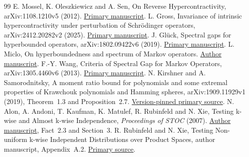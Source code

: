 \documentclass[11pt]{article}
\begin{document}
\begin{thebibliography}{99}
E. Mossel, K. Oleszkiewicz and A. Sen,
On Reverse Hypercontractivity, arXiv:1108.1210v5 (2012).
\href{https://arxiv.org/abs/1108.1210}{Primary manuscript}.
L. Gross, Invariance of intrinsic hypercontractivity under perturbation of
Schr\"odinger operators, arXiv:2412.20282v2 (2025).
\href{https://arxiv.org/abs/2412.20282}{Primary manuscript}.
J. Gl\"uck, Spectral gaps for hyperbounded operators,
arXiv:1802.09422v6 (2019).
\href{https://arxiv.org/abs/1802.09422}{Primary manuscript}.
L. Miclo, On hyperboundedness and spectrum of Markov operators.
\href{https://perso.math.univ-toulouse.fr/miclo/files/2012/04/hyperboundedness.pdf}{Author manuscript}.
F.-Y. Wang, Criteria of Spectral Gap for Markov Operators,
arXiv:1305.4460v6 (2013).
\href{https://arxiv.org/abs/1305.4460v6}{Primary manuscript}.
N. Kirshner and A. Samorodnitsky,
A moment ratio bound for polynomials and some extremal properties of
Krawchouk polynomials and Hamming spheres,
arXiv:1909.11929v1 (2019), Theorem~1.3 and Proposition~2.7.
\href{https://arxiv.org/abs/1909.11929v1}{Version-pinned primary source}.
N. Alon, A. Andoni, T. Kaufman, K. Matulef, R. Rubinfeld and N. Xie,
Testing k-wise and Almost k-wise Independence,
\emph{Proceedings of STOC} (2007).
\href{https://www.mit.edu/~andoni/papers/kwise.pdf}{Author manuscript},
Fact~2.3 and Section~3.
R. Rubinfeld and N. Xie,
Testing Non-uniform k-wise Independent Distributions over Product Spaces,
author manuscript, Appendix~A.2.
\href{https://people.csail.mit.edu/ningxie/papers/RX09.pdf}{Primary source}.
\end{thebibliography}
\end{document}
